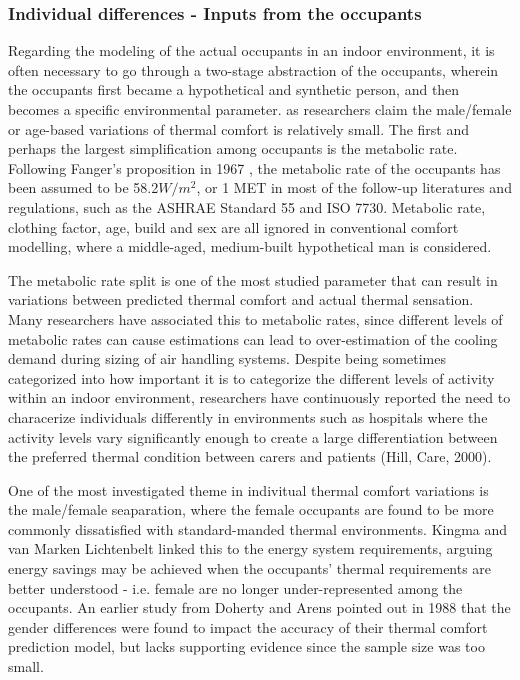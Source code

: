 \subsubsection{Individual differences - Inputs from the occupants}
	Regarding the modeling of the actual occupants in an indoor environment, it is often necessary to go through a two-stage abstraction of the occupants, wherein the occupants first became a hypothetical and synthetic person, and then becomes a specific environmental parameter.  as researchers claim the male/female or age-based variations of thermal comfort is relatively small. 
	The first and perhaps the largest simplification among occupants is the metabolic rate. Following Fanger's proposition in 1967 \cite{fanger_calculation_1967}, the metabolic rate of the occupants has been assumed to be 58.2$W/m^2$, or 1 MET in most of the follow-up literatures and regulations, such as the ASHRAE Standard 55\cite{ashrae_ansi/ashrae_2013} and ISO 7730\cite{iso_iso_2005}.
    Metabolic rate, clothing factor, age, build and sex are all ignored in conventional comfort modelling, where a middle-aged, medium-built hypothetical man is considered.

    The metabolic rate split is one of the most studied parameter that can result in variations between predicted thermal comfort and actual thermal sensation. Many researchers have associated this to metabolic rates, since different levels of metabolic rates can cause estimations can lead to over-estimation of the cooling demand during sizing of air handling systems. Despite being sometimes categorized into how important it is to categorize the different levels of activity within an indoor environment\cite{rupp_associations_2018}, researchers have continuously reported the need to characerize individuals differently in environments such as hospitals where the activity levels vary significantly enough to create a large differentiation between the preferred thermal condition between carers and patients (Hill, Care, 2000). 
    \cite{kingma_energy_2015}
    \cite{rupp_associations_2018}
    \cite{maykot_assessment_2018}

    One of the most investigated theme in indivitual thermal comfort variations is the male/female seaparation, where the female occupants are found to be more commonly dissatisfied with standard-manded thermal environments\cite{kingma_energy_2015}. Kingma and van Marken Lichtenbelt linked this to the energy system requirements, arguing energy savings may be achieved when the occupants' thermal requirements are better understood - i.e. female are no longer under-represented among the occupants\cite{kingma_energy_2015}. An earlier study from Doherty and Arens pointed out in 1988 that the gender differences were found to impact the accuracy of their thermal comfort prediction model, but lacks supporting evidence since the sample size was too small\cite{doherty_evaluation_1988}. 




